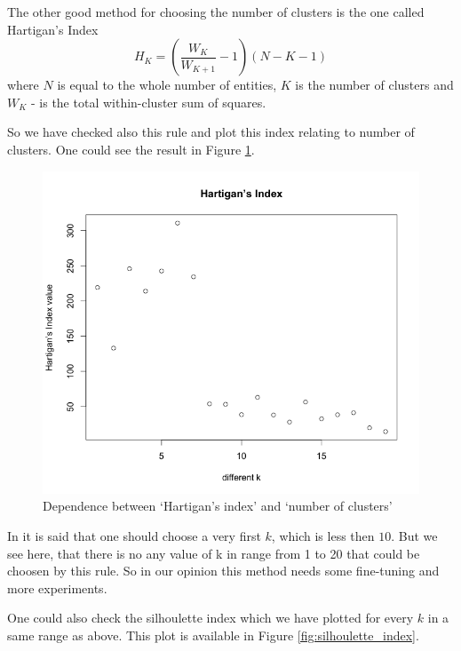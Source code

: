 {{The other good method for choosing the number of clusters is the one called Hartigan’s Index
\begin{equation}
H_K =  \left(\dfrac{W_K}{W_{K+1}} - 1\right) \left(N-K-1\right)
\end{equation}
where $ N $ is equal to the whole number of entities, $ K $ is the number of clusters and $ W_K $ - is the total within-cluster sum of squares. 

So we have checked also this rule and plot this index relating to number of clusters. One could see the result in Figure \ref{fig:hartigan_index}.

\begin{figure}[h]
	\centering
	\begin{minipage}[h]{0.49\linewidth}
		\includegraphics[width=1.2\linewidth]{images/hartigan_index.png}
	\end{minipage}
	\caption{Dependence between `Hartigan's index' and `number of clusters'}
	\label{fig:hartigan_index}	
\end{figure}

In \cite{CCODA_Mirkin} it is said that one should choose a very first $ k $, which is less then $ 10 $.  But we see here, that there is no any value of k in range from 1 to 20 that could be  choosen by this rule. So in our opinion this method needs some fine-tuning and more experiments.

One could also check the silhoulette index which we have plotted for every $ k $ in a same range as above. This plot is available in Figure \ref{fig:silhoulette_index}.
	

}}
